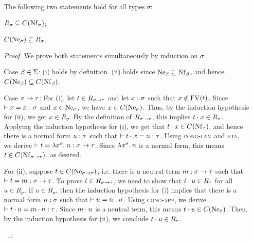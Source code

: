 \begin{lem} \label{lem:computability-normal-forms}
The following two statements hold for all types $\sigma$:
\begin{enum}
\item $R_\sigma \subs \convset{\Nf[\sigma]}$;
\item $\convset{\Ne[\sigma]} \subs R_\sigma$.
\end{enum}
\begin{proof}
We prove both statements simultaneously by induction on $\sigma$.
\begin{items}
\item Case $\beta \in \Sigma$: (i) holds by definition. (ii) holds since $\Ne[\beta] \subs \Nf[\beta]$, and hence $\convset{\Ne[\beta]} \subs \convset{\Nf[\beta]}$.

\item Case $\sigma \to \tau$: For (i), let $t \in R_{\sigma \to \tau}$ and let $x : \sigma$ such that $x \notin \mathrm{FV}_{}(t)$. Since $\vdash x = x : \sigma$ and $x \in \Ne[\sigma]$, we have $x \in \convset{\Ne[\sigma]}$. Thus, by the induction hypothesis for (ii), we get $x \in R_\sigma$. By the definition of $R_{\sigma \to \tau}$, this implies $t \cdot x \in R_\tau$. Applying the induction hypothesis for (i), we get that $\app{t}{x} \in \convset{\Nf[\tau]}$, and hence there is a normal form $n : \tau$ such that $\vdash t \cdot x = n : \tau$. Using \textsc{cong-lam} and \textsc{eta}, we derive $\vdash t = \lambda x^{\sigma}\hspace{-1pt}.\;n : \sigma \to \tau$. Since $\lambda x^{\sigma}\hspace{-1pt}.\;n$ is a normal form, this means $t \in \convset{\Nf[\functy{\sigma}{\tau}]}$, as desired.

For (ii), suppose $t \in \convset{\Ne[\functy{\sigma}{\tau}]}$, i.e. there is a neutral term $m : \sigma \to \tau$ such that $\vdash t = m : \sigma \to \tau$. To prove $t \in R_{\sigma \to \tau}$, we need to show that $t \cdot u \in R_\tau$ for all $u \in R_\sigma$. If $u \in R_\sigma$, then the induction hypothesis for (i) implies that there is a normal form $n : \sigma$ such that $\vdash u = n : \sigma$. Using \textsc{cong-app}, we derive $\vdash t \cdot u = m \cdot n : \tau$. Since $m \cdot n$ is a neutral term, this means $\app{t}{u} \in \convset{\Ne[\tau]}$. Then, by the induction hypothesis for (ii), we conclude $t \cdot u \in R_\tau$. \qedhere
\end{items}
\end{proof}
\end{lem}

